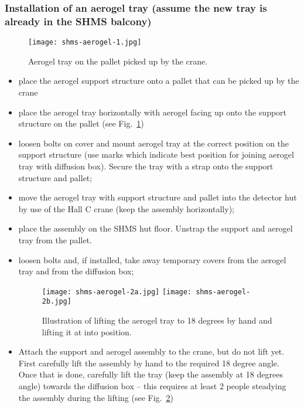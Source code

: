 {\subsubsection*{Installation of an aerogel tray (assume the new tray is
already in the SHMS balcony)}

\begin{figure}
\begin{center}
\texttt{[image: shms-aerogel-1.jpg]}
\caption{\label{fig:shms-aerogel-1}Aerogel tray on the pallet picked
  up by the crane.  }
\end{center}
\end{figure}

\begin{itemize}
  \item place the aerogel support structure onto a pallet that can be
    picked up by the crane
  \item place the aerogel tray horizontally with aerogel facing up
    onto the support structure on the pallet (see Fig.~\ref{fig:shms-aerogel-1})
  \item loosen bolts on cover and mount aerogel tray at the correct
    position on the support structure (use marks which indicate best
    position for joining aerogel tray with diffusion box). Secure the
    tray with a strap onto the support structure and pallet;
  \item  move the aerogel tray with support structure and pallet
    into the detector hut by use of the Hall C crane (keep the
    assembly horizontally);
  \item place the assembly on the SHMS hut floor. Unstrap the support
    and aerogel tray from the pallet.
  \item loosen bolts and, if installed, take away temporary covers
    from the aerogel tray and from the diffusion box;

\begin{figure}
\begin{center}
\texttt{[image: shms-aerogel-2a.jpg]}
\texttt{[image: shms-aerogel-2b.jpg]}
\caption{\label{fig:shms-aerogel-2}Illustration of lifting the aerogel
  tray to 18 degrees by hand and lifting it at into position.}
\end{center}
\end{figure}

  \item Attach the support and aerogel assembly to the crane, but do
    not lift yet. First carefully lift the assembly by hand to the
    required 18 degree angle. Once that is done, carefully lift the
    tray (keep the assembly at 18 degrees angle) towards the diffusion
    box – this requires at least 2 people steadying the assembly
    during the lifting (see Fig.~\ref{fig:shms-aerogel-2})


\end{itemize}}
